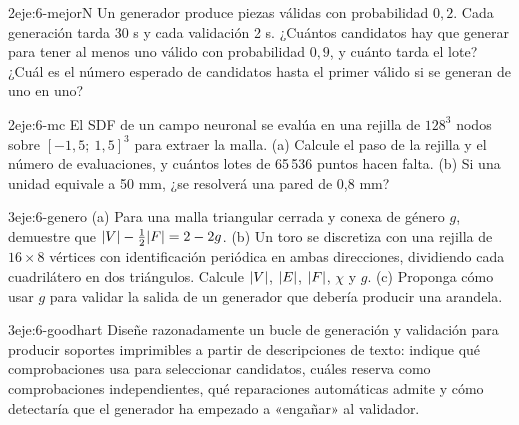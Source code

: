 \begin{ejercicio}{2}{eje:6-mejorN}
Un generador produce piezas válidas con probabilidad $0{,}2$. Cada generación tarda 30 s y cada validación 2 s. ¿Cuántos candidatos hay que generar para tener al menos uno válido con probabilidad $0{,}9$, y cuánto tarda el lote? ¿Cuál es el número esperado de candidatos hasta el primer válido si se generan de uno en uno?
\end{ejercicio}

\begin{ejercicio}{2}{eje:6-mc}
El SDF de un campo neuronal se evalúa en una rejilla de $128^3$ nodos sobre $[-1{,}5;\ 1{,}5]^3$ para extraer la malla. (a) Calcule el paso de la rejilla y el número de evaluaciones, y cuántos lotes de 65\,536 puntos hacen falta. (b) Si una unidad equivale a 50 mm, ¿se resolverá una pared de 0,8 mm?
\end{ejercicio}

\begin{ejercicio}{3}{eje:6-genero}
(a) Para una malla triangular cerrada y conexa de género $g$, demuestre que $\lvert V\rvert-\tfrac12\lvert F\rvert=2-2g$. (b) Un toro se discretiza con una rejilla de $16\times 8$ vértices con identificación periódica en ambas direcciones, dividiendo cada cuadrilátero en dos triángulos. Calcule $\lvert V\rvert$, $\lvert E\rvert$, $\lvert F\rvert$, $\chi$ y $g$. (c) Proponga cómo usar $g$ para validar la salida de un generador que debería producir una arandela.
\end{ejercicio}

\begin{ejercicio}{3}{eje:6-goodhart}
Diseñe razonadamente un bucle de generación y validación para producir soportes imprimibles a partir de descripciones de texto: indique qué comprobaciones usa para seleccionar candidatos, cuáles reserva como comprobaciones independientes, qué reparaciones automáticas admite y cómo detectaría que el generador ha empezado a «engañar» al validador.
\end{ejercicio}
